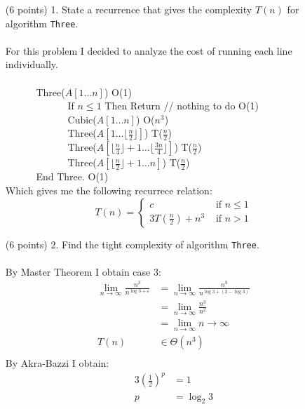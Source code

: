 \documentclass[paper=a4,fontsize=11pt]{article}
\begin{document}
\begin{enumerate}
\item [(6 points) 1.] State a recurrence that gives the complexity $T(n)$ for algorithm \texttt{Three}.\\\\
For this problem I decided to analyze the cost of running each line individually.\\
{\ttfamily
$\phantom{A}$\\
$\phantom{---}$ Three($A[1\dots n]$) O(1)\\
$\phantom{--- ---}$ If $n \leq 1$ Then Return // nothing to do O(1)\\
$\phantom{--- ---}$ Cubic($A[1\dots n]$) O($n^3$)\\
$\phantom{--- ---}$ Three($A[1\dots\lfloor\frac{n}{2}\rfloor]$) T($\frac{n}{2}$)\\
$\phantom{--- ---}$ Three($A[\lfloor\frac{n}{4}\rfloor+1\dots \lfloor\frac{3n}{4}\rfloor]$) T($\frac{n}{2}$)\\
$\phantom{--- ---}$ Three($A[\lfloor\frac{n}{2}\rfloor+1\dots n]$) T($\frac{n}{2}$)\\
$\phantom{---}$ End Three. O(1)
}\\
Which gives me the following recurrece relation:\\
\[
T(n) = \left\{
\begin{array}{cl}
c & \textrm{ if } n \leq 1\\
3T(\frac{n}{2}) + n^3 & \textrm{ if } n > 1
\end{array}
\right.
\]
\item [(6 points) 2.] Find the tight complexity of algorithm \texttt{Three}.\\\\
By Master Theorem I obtain case 3:\\
\begin{align*}
    \lim_{n\to\infty}{\frac{n^3}{n^{\log{3}+\varepsilon}}}&=\lim_{n\to\infty}{\frac{n^3}{n^{\log{3}+(2 - \log{3})}}}\\
    &=\lim_{n\to\infty}{\frac{n^3}{n^2}}\\
    &=\lim_{n\to\infty}{n}\rightarrow\infty\\
    T(n)&\in \Theta(n^{3})\\
\end{align*}
By Akra-Bazzi I obtain:
\begin{align*}
    3(\frac{1}{2})^{p}&=1\\
    p&=\log_{2}{3}
\end{align*}
\begin{align*}

\end{align*}
\end{enumerate}
\end{document}
